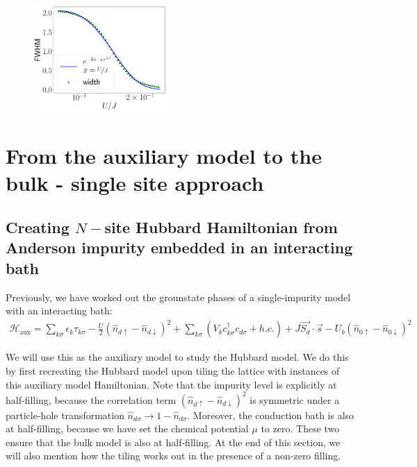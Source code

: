 \documentclass[10pt]{report}
\numberwithin{equation}{section}
\begin{document}
\begin{figure}[!htpb]
	\centering
	\includegraphics[width=0.45\textwidth]{../figures/spec_func_width_fit.pdf}
\end{figure}


\chapter{From the auxiliary model to the bulk - single site approach}
\label{chap:tile}

\section{Creating \(N-\)site Hubbard Hamiltonian from Anderson impurity embedded in an interacting bath}

Previously, we have worked out the grounstate phases of a single-impurity model with an interacting bath:
\begin{equation}\begin{aligned}
	\label{siam_attr}
	\mathcal{H}_\text{aux} = \sum_{k\sigma}\epsilon_k \tau_{k\sigma} - \frac{U}{2}\left(\hat n_{d \uparrow} - \hat n_{d \downarrow} \right) ^2 + \sum_{k\sigma} \left(V_{k} c^\dagger_{k\sigma} c_{d\sigma} + h.c.\right) +J \vec{S_d}\cdot\vec{s} - U_b\left(\hat n_{0 \uparrow} - \hat n_{0 \downarrow}\right)^2 
\end{aligned}\end{equation}
 
We will use this as the auxiliary model to study the Hubbard model. We do this by first recreating the Hubbard model upon tiling the lattice with instances of this auxiliary model Hamiltonian. Note that the impurity level is explicitly at half-filling, because the correlation term \(\left( \hat n_{d \uparrow} - \hat n_{d \downarrow} \right) ^2\) is symmetric under a particle-hole transformation \(\hat n_{d\sigma} \to 1 - \hat n_{d\sigma}\). Moreover, the conduction bath is also at half-filling, because we have set the chemical potential \(\mu\) to zero. These two ensure that the bulk model is also at half-filling. At the end of this section, we will also mention how the tiling works out in the presence of a non-zero filling.
\end{document}
